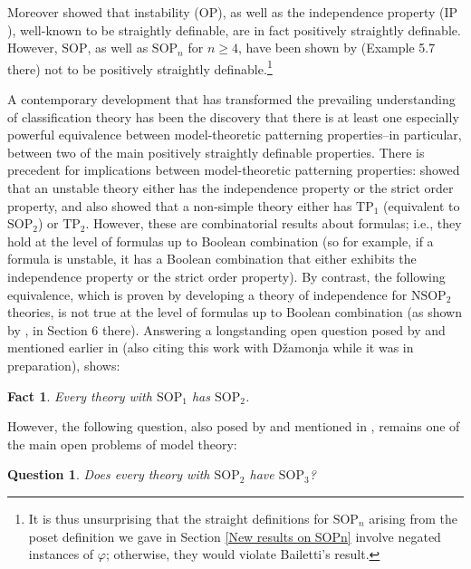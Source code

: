 \documentclass{article}
\newcommand{\SOP}{\text{SOP}}
\newcommand{\vphi}{\varphi}
\newtheorem{question}{Question}
\newtheorem{fact}{Fact}
\theoremstyle{definition}
\theoremstyle{definition}
\theoremstyle{definition}
\begin{document}
Moreover \cite{day2025results} showed that instability ($\mathrm{OP}$), as well as the independence property ($\mathrm{IP}$), well-known to be straightly definable, are in fact positively straightly definable. However, $\mathrm{SOP}$, as well as $\mathrm{SOP}_{n}$ for $n \geq 4$, have been shown by \cite{bailetti2024walk} (Example 5.7 there) not to be positively straightly definable.\footnote{It is thus unsurprising that the straight definitions for $\SOP_n$ arising from the poset definition we gave in Section \ref{New results on SOPn} involve negated instances of $\vphi$; otherwise, they would violate Bailetti's result.}

A contemporary development that has transformed the prevailing understanding of classification theory has been the discovery that there is at least one especially powerful equivalence between model-theoretic patterning properties--in particular, between two of the main positively straightly definable properties. There is precedent for implications between model-theoretic patterning properties: \cite{shelah1990classification} showed that an unstable theory either has the independence property or the strict order property, and also showed that a non-simple theory either has $\mathrm{TP}_{1}$ (equivalent to $\mathrm{SOP}_{2}$) or $\mathrm{TP}_{2}$. However, these are combinatorial results about formulas; i.e., they hold at the level of formulas up to Boolean combination (so for example, if a formula is unstable, it has a Boolean combination that either exhibits the independence property or the strict order property). By contrast, the following equivalence, which is proven by developing a theory of independence for $\mathrm{NSOP}_{2}$ theories, is not true at the level of formulas up to Boolean combination (as shown by \cite{AhnKim2024natp}, in Section 6 there). Answering a longstanding open question posed by \cite{Dzamonja2004} and mentioned earlier in \cite{shelah_what_2000} (also citing this work with Džamonja while it was in preparation), \cite{Mutchnik2026nsop2} shows:

\begin{fact}\label{sop1 equals sop2}
 Every theory with $\mathrm{SOP}_{1}$ has $\mathrm{SOP}_{2}$.
\end{fact}


However, the following question, also posed by \cite{Dzamonja2004} and mentioned in \cite{shelah_what_2000}, remains one of the main open problems of model theory:

\begin{question}\label{is sop2 equal to sop3}
    Does every theory with $\mathrm{SOP}_{2}$ have $\mathrm{SOP}_{3}$?
\end{question}
\end{document}
